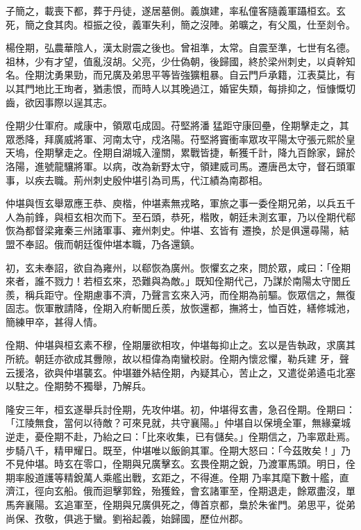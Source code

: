 \begin{pinyinscope}
 子簡之，載喪下都，葬于丹徒，遂居墓側。義旗建，率私僮客隨義軍躡桓玄。玄
 死，簡之食其肉。桓振之役，義軍失利，簡之沒陣。弟曠之，有父風，仕至剡令。



 楊佺期，弘農華陰人，漢太尉震之後也。曾祖準，太常。自震至準，七世有名德。祖林，少有才望，值亂沒胡。父亮，少仕偽朝，後歸國，終於梁州刺史，以貞幹知名。佺期沈勇果勁，而兄廣及弟思平等皆強獷粗暴。自云門戶承籍，江表莫比，有以其門地比王珣者，猶恚恨，而時人以其晚過江，婚宦失類，每排抑之，恒慷慨切齒，欲因事際以逞其志。



 佺期少仕軍府。咸康中，領眾屯成固。苻堅將潘
 猛距守康回壘，佺期擊走之，其眾悉降，拜廣威將軍、河南太守，戍洛陽。苻堅將竇衝率眾攻平陽太守張元熙於皇天塢，佺期擊走之。佺期自湖城入潼關，累戰皆捷，斬獲千計，降九百餘家，歸於洛陽，進號龍驤將軍。以病，改為新野太守，領建威司馬。遷唐邑太守，督石頭軍事，以疾去職。荊州刺史殷仲堪引為司馬，代江績為南郡相。



 仲堪與恆玄舉眾應王恭、庾楷，仲堪素無戎略，軍旅之事一委佺期兄弟，以兵五千人為前鋒，與桓玄相次而下。至石頭，恭死，楷敗，朝廷未測玄軍，乃以佺期代郗恢為都督梁雍秦三州諸軍事、雍州刺史。仲堪、玄皆有
 遷換，於是俱還尋陽，結盟不奉詔。俄而朝廷復仲堪本職，乃各還鎮。



 初，玄未奉詔，欲自為雍州，以郗恢為廣州。恢懼玄之來，問於眾，咸曰：「佺期來者，誰不戮力！若桓玄來，恐難與為敵。」既知佺期代己，乃謀於南陽太守閭丘羨，稱兵距守。佺期慮事不濟，乃聲言玄來入沔，而佺期為前驅。恢眾信之，無復固志。恢軍散請降，佺期入府斬閭丘羨，放恢還都，撫將士，恤百姓，繕修城池，簡練甲卒，甚得人情。



 佺期、仲堪與桓玄素不穆，佺期屢欲相攻，仲堪每抑止之。玄以是告執政，求廣其所統。朝廷亦欲成其釁隙，故以桓偉為南蠻校尉。佺期內懷忿懼，勒兵建
 牙，聲云援洛，欲與仲堪襲玄。仲堪雖外結佺期，內疑其心，苦止之，又遣從弟遹屯北塞以駐之。佺期勢不獨舉，乃解兵。



 隆安三年，桓玄遂舉兵討佺期，先攻仲堪。初，仲堪得玄書，急召佺期。佺期曰：「江陵無食，當何以待敵？可來見就，共守襄陽。」仲堪自以保境全軍，無緣棄城逆走，憂佺期不赴，乃紿之曰：「比來收集，已有儲矣。」佺期信之，乃率眾赴焉。步騎八千，精甲耀日。既至，仲堪唯以飯餉其軍。佺期大怒曰：「今茲敗矣！」乃不見仲堪。時玄在零口，佺期與兄廣擊玄。玄畏佺期之銳，乃渡軍馬頭。明日，佺期率殷道護等精銳萬人乘艦出戰，玄距之，不得進。佺期
 乃率其麾下數十艦，直濟江，徑向玄船。俄而迴擊郭銓，殆獲銓，會玄諸軍至，佺期退走，餘眾盡沒，單馬奔襄陽。玄追軍至，佺期與兄廣俱死之，傳首京都，梟於朱雀門。弟思平，從弟尚保、孜敬，俱逃于蠻。劉裕起義，始歸國，歷位州郡。




\end{pinyinscope}
